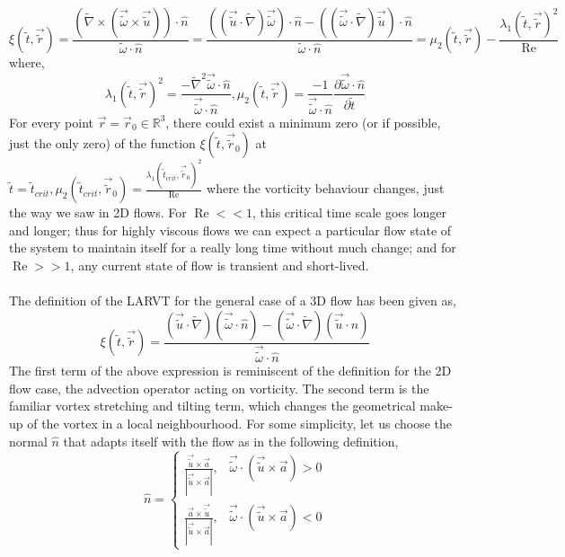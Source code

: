 \documentclass{article}
\begin{document}
\begin{equation*}
\xi(\tilde{t},\vec{\tilde{r}}) = \frac{(\tilde{\nabla} \times (\vec{\tilde{\omega}}\times \vec{\tilde{u}})) \cdot \hat{n}}{\tilde{\omega} \cdot \hat{n}} = \frac{((\vec{\tilde{u}}\cdot\tilde{\nabla})\vec{\tilde{\omega}})\cdot\hat{n} - ((\vec{\tilde{\omega}}\cdot\tilde{\nabla})\vec{\tilde{u}})\cdot\hat{n}}{\tilde{\omega} \cdot \hat{n}} = \mu_2(\tilde{t},\vec{\tilde{r}}) - \frac{\lambda_1(\tilde{t},\vec{\tilde{r}})^2}{\operatorname{Re}}
\end{equation*}
where,
\begin{equation*}
\lambda_1(\tilde{t},\vec{\tilde{r}})^2 = \frac{-\tilde{\nabla}^2 \vec{\tilde{\omega}} \cdot \hat{n}}{\vec{\tilde{\omega}} \cdot \hat{n}}, \mu_2(\tilde{t},\vec{\tilde{r}}) = \frac{-1}{\vec{\tilde{\omega}}\cdot \hat{n}} \frac{\partial\vec{\tilde{\omega}}\cdot \hat{n}}{\partial \tilde{t}}
\end{equation*}
For every point $\vec{r} = \vec{r}_0 \in \mathbb{R}^3$, there could exist a minimum zero (or if possible, just the only zero) of the function $\xi(\tilde{t},\vec{\tilde{r}}_0)$ at $\tilde{t} = \tilde{t}_{crit}, \mu_2(\tilde{t}_{crit},\vec{\tilde{r}}_0) = \frac{\lambda_1(\tilde{t}_{crit},\vec{\tilde{r}}_0)^2}{\operatorname{Re}}$ where the vorticity behaviour changes, just the way we saw in 2D flows. For $\operatorname{Re} << 1$, this critical time scale goes longer and longer; thus for highly viscous flows we can expect a particular flow state of the system to maintain itself for a really long time without much change; and for $\operatorname{Re} >> 1$, any current state of flow is transient and short-lived. \\ \\
The definition of the LARVT for the general case of a 3D flow has been given as,
\begin{equation} \label{eqn44}
\xi(\tilde{t},\vec{\tilde{r}}) = \frac{(\vec{\tilde{u}}\cdot\tilde{\nabla})(\vec{\tilde{\omega}}\cdot\hat{n}) - (\vec{\tilde{\omega}}\cdot\tilde{\nabla})(\vec{\tilde{u}}\cdot\hat{n})}{\vec{\tilde{\omega}} \cdot \hat{n}}
\end{equation}
The first term of the above expression is reminiscent of the definition for the 2D flow case, the advection operator acting on vorticity. The second term is the familiar vortex stretching and tilting term, which changes the geometrical make-up of the vortex in a local neighbourhood. For some simplicity, let us choose the normal $\hat{n}$ that adapts itself with the flow as in the following definition,
\begin{equation*}
\hat{n} = \begin{cases}
\frac{\vec{\tilde{u}}\times\vec{a}}{|\vec{\tilde{u}}\times\vec{a}|}, & \vec{\tilde{\omega}}\cdot(\vec{\tilde{u}}\times\vec{a})>0 \\
\frac{\vec{a}\times\vec{\tilde{u}}}{|\vec{\tilde{u}}\times\vec{a}|}, & \vec{\tilde{\omega}}\cdot(\vec{\tilde{u}}\times\vec{a})<0
\end{cases}
\end{equation*}
\end{document}
